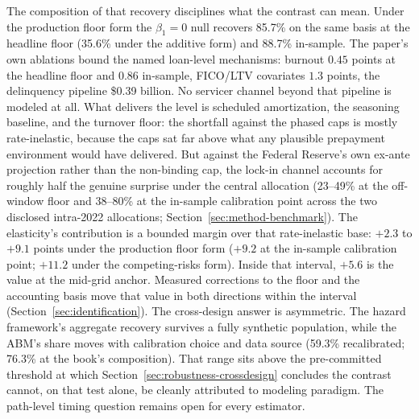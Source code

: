 \documentclass[12pt]{article}
\begin{document}
The composition of that recovery disciplines what the contrast can mean. Under the production floor form the $\beta_1 = 0$ null recovers 85.7\% on the same basis at the headline floor (35.6\% under the additive form) and 88.7\% in-sample. The paper's own ablations bound the named loan-level mechanisms: burnout $0.45$ points at the headline floor and $0.86$ in-sample, FICO/LTV covariates $1.3$ points, the delinquency pipeline \$0.39 billion. No servicer channel beyond that pipeline is modeled at all. What delivers the level is scheduled amortization, the seasoning baseline, and the turnover floor: the shortfall against the phased caps is mostly rate-inelastic, because the caps sat far above what any plausible prepayment environment would have delivered. But against the Federal Reserve's own ex-ante projection rather than the non-binding cap, the lock-in channel accounts for roughly half the genuine surprise under the central allocation (23--49\% at the off-window floor and 38--80\% at the in-sample calibration point across the two disclosed intra-2022 allocations; Section~\ref{sec:method-benchmark}). The elasticity's contribution is a bounded margin over that rate-inelastic base: $+2.3$ to $+9.1$ points under the production floor form ($+9.2$ at the in-sample calibration point; $+11.2$ under the competing-risks form). Inside that interval, $+5.6$ is the value at the mid-grid anchor. Measured corrections to the floor and the accounting basis move that value in both directions within the interval (Section~\ref{sec:identification}). The cross-design answer is asymmetric. The hazard framework's aggregate recovery survives a fully synthetic population, while the ABM's share moves with calibration choice and data source (59.3\% recalibrated; 76.3\% at the book's composition). That range sits above the pre-committed threshold at which Section~\ref{sec:robustness-crossdesign} concludes the contrast cannot, on that test alone, be cleanly attributed to modeling paradigm. The path-level timing question remains open for every estimator.
\end{document}
